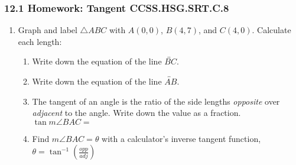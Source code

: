 

\fancyhead[LE]{\thepage}



\subsubsection*{12.1 Homework: Tangent \hfill CCSS.HSG.SRT.C.8}
\begin{enumerate}
\item Graph and label $\triangle ABC$ with $A(0,0)$, $B(4,7)$, and $C(4,0)$. Calculate each length:
  \begin{enumerate}[itemsep=1.5cm]
    \item Write down the equation of the line $\overleftrightarrow{BC}$.
    \item Write down the equation of the line $\overleftrightarrow{AB}$. 
    \item The tangent of an angle is the ratio of the side lengths \emph{opposite} over \emph{adjacent} to the angle. Write down the value as a fraction. \\[0.5cm]
      $\tan m \angle BAC=$
    \item Find $m\angle BAC=\theta$ with a calculator's inverse tangent function, $\displaystyle \theta = \tan^{-1}(\frac{opp}{adj})$
    \vspace{2cm}
  \end{enumerate}


\end{enumerate}
